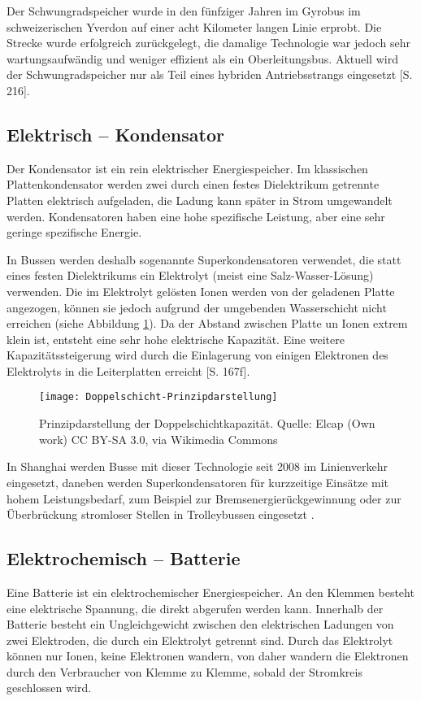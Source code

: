 Der Schwungradspeicher wurde in den fünfziger Jahren im Gyrobus im schweizerischen Yverdon auf einer acht Kilometer langen Linie erprobt. Die Strecke wurde erfolgreich zurückgelegt, die damalige Technologie war jedoch sehr wartungsaufwändig und weniger effizient als ein Oberleitungsbus. Aktuell wird der Schwungradspeicher nur als Teil eines hybriden Antriebsstrangs eingesetzt \cite{tub_aleph001746639}[S. 216].

\subsection{Elektrisch – Kondensator}
Der Kondensator ist ein rein elektrischer Energiespeicher. Im klassischen Plattenkondensator werden zwei durch einen festes Dielektrikum getrennte Platten elektrisch aufgeladen, die Ladung kann später in Strom umgewandelt werden. Kondensatoren haben eine hohe spezifische Leistung, aber eine sehr geringe spezifische Energie.

In Bussen werden deshalb sogenannte Superkondensatoren verwendet, die statt eines festen Dielektrikums ein Elektrolyt (meist eine Salz-Wasser-Lösung) verwenden. Die im Elektrolyt gelösten Ionen werden von der geladenen Platte angezogen, können sie jedoch aufgrund der umgebenden Wasserschicht nicht erreichen (siehe Abbildung \ref{abb_doppelschicht}). Da der Abstand zwischen Platte un Ionen extrem klein ist, entsteht eine sehr hohe elektrische Kapazität. Eine weitere Kapazitätssteigerung wird durch die Einlagerung von einigen Elektronen des Elektrolyts in die Leiterplatten erreicht \cite{Sterner:2014}[S. 167f].

\begin{figure}\centering
	\texttt{[image: Doppelschicht-Prinzipdarstellung]}
	\caption{Prinzipdarstellung der Doppelschichtkapazität. Quelle: Elcap (Own work) CC BY-SA 3.0, via Wikimedia Commons}
	\label{abb_doppelschicht}
\end{figure}

In Shanghai werden Busse mit dieser Technologie seit 2008 im Linienverkehr eingesetzt, daneben werden Superkondensatoren für kurzzeitige Einsätze mit hohem Leistungsbedarf, zum Beispiel zur Bremsenergierückgewinnung oder zur Überbrückung stromloser Stellen in Trolleybussen eingesetzt \cite{Barminer-Busgesellschaft:2012}.

\subsection{Elektrochemisch – Batterie} %
Eine Batterie ist ein elektrochemischer Energiespeicher. An den Klemmen besteht eine elektrische Spannung, die direkt abgerufen werden kann. Innerhalb der Batterie besteht ein Ungleichgewicht zwischen den elektrischen Ladungen von zwei Elektroden, die durch ein Elektrolyt getrennt sind. Durch das Elektrolyt können nur Ionen, keine Elektronen wandern, von daher wandern die Elektronen durch den Verbraucher von Klemme zu Klemme, sobald der Stromkreis geschlossen wird.

